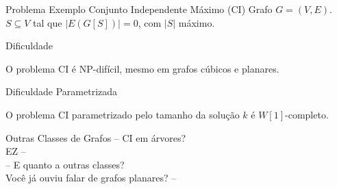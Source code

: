 \begin{frame}{Problema Exemplo}
        {Conjunto Independente Máximo (CI)}
        {Grafo $G = (V, E)$.\pause}
        {$S \subseteq V$ tal que $|E(G[S])|=0$, com $|S|$ máximo.}
\end{frame}

\begin{frame}{Dificuldade}
    \begin{thm}[\cite{Ga79}]
        O problema CI é NP-difícil, mesmo em grafos cúbicos e planares.
    \end{thm}
\end{frame}

\begin{frame}{Dificuldade Parametrizada}
    \begin{thm}
        O problema CI parametrizado pelo tamanho da solução $k$ é $W[1]$-completo.
    \end{thm}
\end{frame}

\begin{frame}{Outras Classes de Grafos}
    -- CI em árvores?\\
    \pause
    \hfill EZ --\\
    \pause \bigbreak
    \Large
    -- E quanto a outras classes?\\
    \pause
    \hfill Você já ouviu falar de grafos planares? --
\end{frame}
